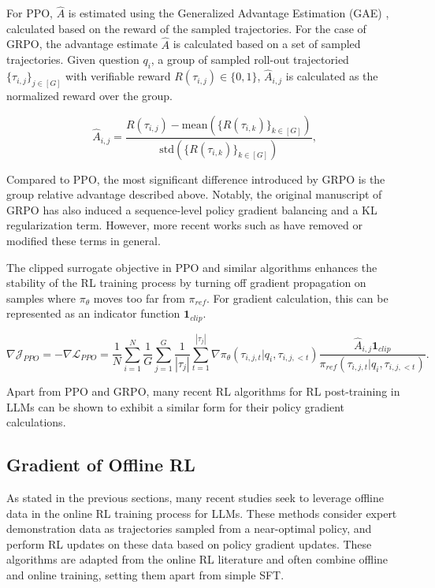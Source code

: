\documentclass{article} %
\newcommand{\0}{\mathbb{0}}
\newcommand{\1}{\mathbb{1}}
\newcommand{\one}{\mathbf{1}}
\newcommand{\cL}{\mathcal{L}}
\begin{document}
For PPO, $\hat{A}$ is estimated using the Generalized Advantage Estimation (GAE) \citep{schulman2015high}, calculated based on the reward of the sampled trajectories. For the case of GRPO, the advantage estimate $\hat{A}$ is calculated based on a set of sampled trajectories. Given question $q_i$, a group of sampled roll-out trajectoried $\{\tau_{i,j}\}_{j \in [G]}$ with verifiable reward $R(\tau_{i,j}) \in \{0, 1\}$, $\hat{A}_{i,j}$ is calculated as the normalized reward over the group.

\begin{equation}\label{eq_A_GRPO}
    \hat{A}_{i,j} = \frac{R(\tau_{i,j}) - \text{mean} (\{R(\tau_{i,k})\}_{k \in [G]})}{ \text{std} (\{R(\tau_{i,k})\}_{k \in [G]})},
\end{equation}

Compared to PPO, the most significant difference introduced by GRPO is the group relative advantage described above. Notably, the original manuscript of GRPO has also induced a sequence-level policy gradient balancing and a KL regularization term. However, more recent works such as \citep{yu2025dapo} have removed or modified these terms in general.

The clipped surrogate objective in PPO and similar algorithms enhances the stability of the RL training process by turning off gradient propagation on samples where $\pi_\theta$ moves too far from $\pi_{ref}$. For gradient calculation, this can be represented as an indicator function $\one_{clip}$. 

\begin{equation}\label{eq_PPO_grad}
    \nabla \mathcal{J}_{PPO} = -\nabla \cL_{PPO} =     \frac{1}{N}\sum_{i=1}^N \frac{1}{G}\sum_{j=1}^G \frac{1}{|\tau_j|} \sum_{t=1}^{|\tau_j|} 
    \nabla \pi_\theta (\tau_{i,j,t} |q_i, \tau_{i,j, <t} )  \frac{\hat{A}_{i,j} \one_{clip}}{\pi_{ref} (\tau_{i,j,t} |q_i, \tau_{i,j, <t} )} .
\end{equation}

Apart from PPO and GRPO, many recent RL algorithms for RL post-training in LLMs can be shown to exhibit a similar form for their policy gradient calculations.


\subsection{Gradient of Offline RL}

As stated in the previous sections, many recent studies seek to leverage offline data in the online RL training process for LLMs.
These methods consider expert demonstration data as trajectories sampled from a near-optimal policy, and perform RL updates on these data based on policy gradient updates. These algorithms are adapted from the online RL literature and often combine offline and online training, setting them apart from simple SFT.
\end{document}
